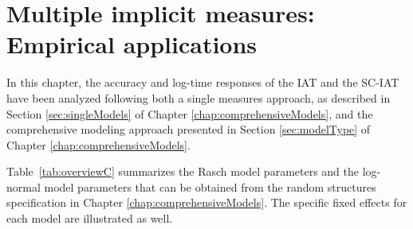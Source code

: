 \documentclass[12pt]{book}
\begin{document}
\chapter[Multiple implicit measures: Empirical applications]{Multiple implicit measures: Empirical applications} \label{chap:comprehensiveApplications}

In this chapter, the accuracy and log-time responses of the IAT and the SC-IAT have been analyzed following both a single measures approach, as described in Section \ref{sec:singleModels} of Chapter \ref{chap:comprehensiveModels}, and  the comprehensive modeling approach presented in Section \ref{sec:modelType} of Chapter \ref{chap:comprehensiveModels}.


Table~\ref{tab:overviewC} summarizes the Rasch model parameters and the log-normal model parameters that can be obtained from the random structures specification in Chapter \ref{chap:comprehensiveModels}.  
The specific fixed effects for each model are illustrated as well.
\end{document}
